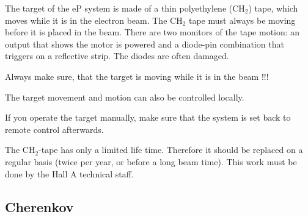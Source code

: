{The target of the eP system is made of a thin polyethylene (CH$_2$) tape, which 
moves while it is in the electron beam. 
The CH$_2$ tape  must always be moving before 
it is placed in the beam. There are two monitors of the tape motion:
an output that shows the motor is powered and a diode-pin combination 
that triggers on a reflective strip. The diodes are often damaged.\\
\begin{safetyen}{10}{5}
Always make sure, that the target is moving while it is in the beam !!!\\
\end{safetyen}
The target movement and motion can also be controlled locally.
\\
\begin{safetyen}{10}{5}
If you operate the target manually, make sure that the system
is set back to remote control afterwards.\\
\end{safetyen}
The CH$_2$-tape has only a limited life time. Therefore it
should be replaced on a regular basis (twice per year, or 
before a long beam time). This work must be done by the 
Hall A technical staff. 

\subsection{Cherenkov}
\label{sec:ep_cer}

}
